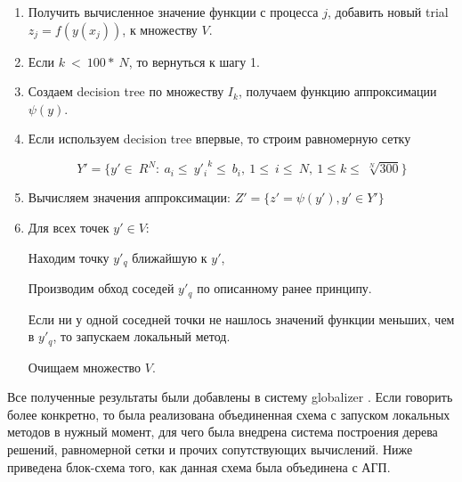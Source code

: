 \documentclass[12pt, a4paper, russian]{article}
\begin{document}
\begin{enumerate}
\item  Получить вычисленное  значение функции с процесса $j$, добавить новый trial $z_j = f(y(x_j))$, к множеству $V$. 



\item 	Если $ k\ <\ 100\ast\ N$, то вернуться к шагу 1.


\item Создаем decision tree по множеству $I_k$, получаем функцию аппроксимации  $\psi(y)$.



\item 	Если используем decision tree впервые, то строим равномерную сетку

\begin{displaymath}
	Y'=\{ y'\in\ R^N:\ a_i\le\  {y'_i}^k \le\ b_i,\ 1\le\ i\le\ N,\ 1\le k\le\ \sqrt[N]{300}  \}
\end{displaymath}

\item 	Вычисляем значения аппроксимации: $Z' = \{ z'=  \psi(y'), y' \in Y'\}$

\item Для всех точек $y'\in V$:

Находим точку $y'_q$ ближайшую  к $y'$,

Производим обход соседей $y'_q$ по описанному ранее принципу.

Если ни у одной соседней точки не нашлось значений функции меньших, чем в $y'_q$, то запускаем локальный метод.

Очищаем множество $V$.


\end{enumerate}



Все полученные результаты были добавлены в систему globalizer \cite{fio_bib18}.
Если говорить более конкретно, то была реализована объединенная схема с запуском локальных методов в нужный момент, для чего была внедрена система  построения дерева решений, равномерной сетки и прочих сопутствующих вычислений.  
Ниже приведена блок-схема того, как данная схема была объединена с АГП.
\end{document}
